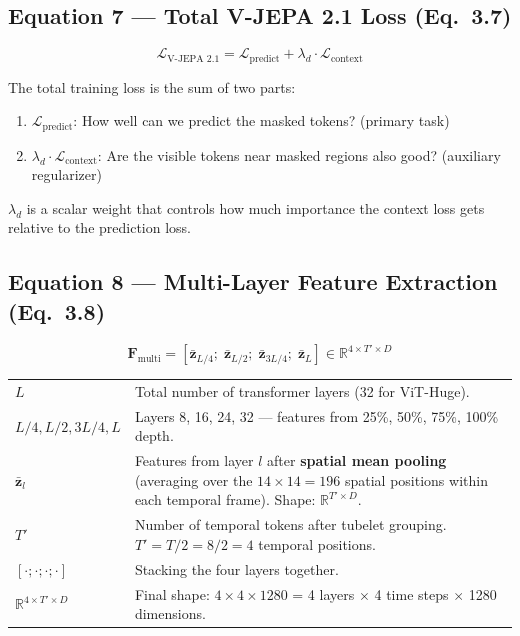 \documentclass[12pt, a4paper]{article}
\begin{document}
\subsection{Equation 7 --- Total V-JEPA 2.1 Loss (Eq.~3.7)}

\begin{eqbox}
\[
\mathcal{L}_{\text{V-JEPA~2.1}} = \mathcal{L}_{\text{predict}} + \lambda_d \cdot \mathcal{L}_{\text{context}}
\]
\end{eqbox}

\begin{explainbox}
The total training loss is the sum of two parts:
\begin{enumerate}
    \item $\mathcal{L}_{\text{predict}}$: How well can we predict the masked tokens? (primary task)
    \item $\lambda_d \cdot \mathcal{L}_{\text{context}}$: Are the visible tokens near masked regions also good? (auxiliary regularizer)
\end{enumerate}
$\lambda_d$ is a scalar weight that controls how much importance the context loss gets relative to the prediction loss.
\end{explainbox}


\subsection{Equation 8 --- Multi-Layer Feature Extraction (Eq.~3.8)}

\begin{eqbox}
\[
\mathbf{F}_{\text{multi}} = [\bar{\mathbf{z}}_{L/4};\; \bar{\mathbf{z}}_{L/2};\; \bar{\mathbf{z}}_{3L/4};\; \bar{\mathbf{z}}_{L}] \in \mathbb{R}^{4 \times T' \times D}
\]
\end{eqbox}

\begin{explainbox}
\begin{tabular}{lp{11cm}}
$L$ & Total number of transformer layers (32 for ViT-Huge).\\[0.2cm]
$L/4, L/2, 3L/4, L$ & Layers 8, 16, 24, 32 --- features from 25\%, 50\%, 75\%, 100\% depth.\\[0.2cm]
$\bar{\mathbf{z}}_l$ & Features from layer $l$ after \textbf{spatial mean pooling} (averaging over the $14 \times 14 = 196$ spatial positions within each temporal frame). Shape: $\mathbb{R}^{T' \times D}$.\\[0.2cm]
$T'$ & Number of temporal tokens after tubelet grouping. $T' = T/2 = 8/2 = 4$ temporal positions.\\[0.2cm]
$[\cdot;\cdot;\cdot;\cdot]$ & Stacking the four layers together.\\[0.2cm]
$\mathbb{R}^{4 \times T' \times D}$ & Final shape: $4 \times 4 \times 1280$ = 4 layers $\times$ 4 time steps $\times$ 1280 dimensions.
\end{tabular}
\end{explainbox}
\end{document}
